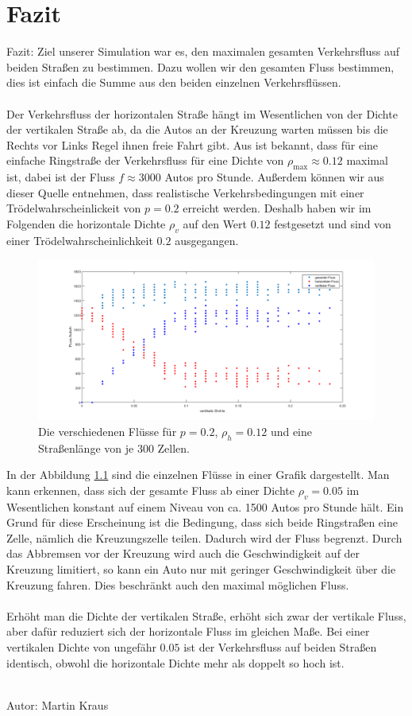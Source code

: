 \chapter{Fazit}\label{chap5}

Fazit: Ziel unserer Simulation war es, den maximalen gesamten Verkehrsfluss auf beiden Straßen zu bestimmen. Dazu wollen wir den gesamten Fluss bestimmen, dies ist einfach die Summe aus den beiden einzelnen Verkehrsflüssen.
\\ \\
Der Verkehrsfluss der horizontalen Straße hängt im Wesentlichen von der Dichte der vertikalen Straße ab, da die Autos an der Kreuzung warten müssen bis die Rechts vor Links Regel ihnen freie Fahrt gibt. Aus \cite{book:bungartz} ist bekannt, dass für eine einfache Ringstraße der Verkehrsfluss für eine Dichte von $\rho_{\max} \approx 0.12$ maximal ist, dabei ist der Fluss $f \approx 3000$ Autos pro Stunde. Außerdem können wir aus dieser Quelle entnehmen, dass realistische Verkehrsbedingungen mit einer Trödelwahrscheinlickeit von $p=0.2$ erreicht werden. Deshalb haben wir im Folgenden die horizontale Dichte $\rho_v$ auf den Wert $0.12$ festgesetzt und sind von einer Trödelwahrscheinlichkeit $0.2$ ausgegangen. 
%
\begin{figure}[H]%
\centering
\includegraphics[width=12cm]{MaxFluss.png}%
\caption[Flussdiagramm]{Die verschiedenen Flüsse für $p=0.2$, $\rho_h=0.12$ und eine Straßenlänge von je 300 Zellen.}%
\label{pic:MaxFluss}%
\end{figure}
\noindent
In der Abbildung \ref{pic:MaxFluss} sind die einzelnen Flüsse in einer Grafik dargestellt. Man kann erkennen, dass sich der gesamte Fluss ab einer Dichte $\rho_v =0.05$ im Wesentlichen konstant auf einem Niveau von ca. 1500 Autos pro Stunde hält. Ein Grund für diese Erscheinung ist die Bedingung, dass sich beide Ringstraßen eine Zelle, nämlich die Kreuzungszelle teilen. Dadurch wird der Fluss begrenzt. Durch das Abbremsen vor der Kreuzung wird auch die Geschwindigkeit auf der Kreuzung limitiert, so kann ein Auto nur mit geringer Geschwindigkeit über die Kreuzung fahren. Dies beschränkt auch den maximal möglichen Fluss. 
\\ \\
Erhöht man die Dichte der vertikalen Straße, erhöht sich zwar der vertikale Fluss, aber dafür reduziert sich der horizontale Fluss im gleichen Maße. Bei einer vertikalen Dichte von ungefähr $0.05$ ist der Verkehrsfluss auf beiden Straßen identisch, obwohl die horizontale Dichte mehr als doppelt so hoch ist. \\ \\

\begin{flushright}
Autor: Martin Kraus
\end{flushright}

